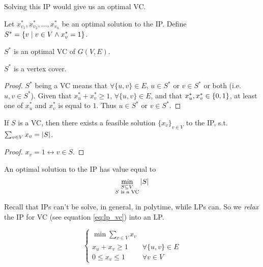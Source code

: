     Solving this IP would give us an optimal VC.

    Let $x_{v_1}^*, x_{v_2}^*, \dots, x_{v_n}^*$ be an optimal solution to the IP. Define $S^* = \{ v \; \vert \; v \in V \wedge x_v^* = 1 \}$.

    \begin{theorem}
        $S^*$ is an optimal VC of $G(V,E)$.
    \end{theorem}

    \begin{lemma}
        $S^*$ is a vertex cover.
    \end{lemma}

    \begin{proof}
        $S^*$ being a VC means that $\forall \{u,v\} \in E$, $u \in S^*$ or $v \in S^*$ or both (i.e. $u,v \in S^*$).
        Given that $x_u^* + x_v^* \geq 1$, $\forall \{ u,v \} \in E$, and that $x_u^*, x_v^* \in \{ 0,1 \}$, at least one of $x_u^*$ and $x_v^*$ is equal to $1$.
        Thus $u \in S^*$ or $v \in S^*$.
    \end{proof}

    \begin{lemma}
        If $S$ is a VC, then there exists a feasible solution $\{ x_v \}_{v \in V}$ to the IP, s.t. $\sum_{v \in V} x_v = \vert S \vert$.
    \end{lemma}

    \begin{proof}
        $x_v = 1 \leftrightarrow v \in S$.
    \end{proof}

    \begin{corollary}
        An optimal solution to the IP has value equal to
        \[ \min_{\substack{S \subseteq V\\ S \text{ is a VC}}} \vert S \vert \]
    \end{corollary}

    Recall that IPs can't be solve, in general, in polytime, while LPs can.
    So we \textit{relax} the IP for VC (see equation \ref{eq:lp_vc}) into an LP.
    
    \begin{equation}\label{eq:ip_vc}
        \begin{cases}
            \min \sum_{v \in V} x_v\\
            x_u + x_v \geq 1    & \forall \{ u,v \} \in E\\
            0 \leq x_v \leq 1   & \forall v \in V
        \end{cases}
    \end{equation}

